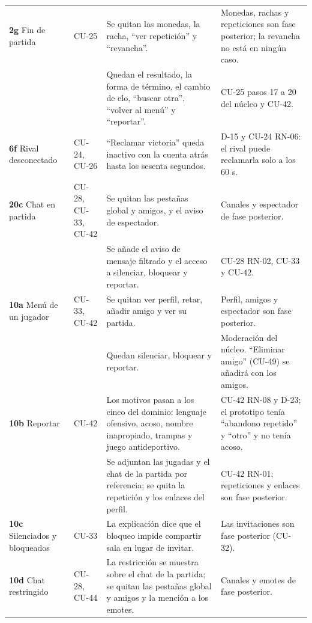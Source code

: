 \begin{center}
\begin{longtable}{|L{0.1\textwidth}|L{0.13\textwidth}|L{0.335\textwidth}|L{0.32\textwidth}|}
\textbf{2g} Fin de partida & \mbox{CU-25} & Se quitan las monedas, la racha, ``ver repetición'' y ``revancha''. & Monedas, rachas y repeticiones son fase posterior; la revancha no está en ningún caso. \\ 
 &  & Quedan el resultado, la forma de término, el cambio de elo, ``buscar otra'', ``volver al menú'' y ``reportar''. & \mbox{CU-25} pasos 17 a 20 del núcleo y \mbox{CU-42}. \\ \hline
\textbf{6f} Rival desconectado & \mbox{CU-24}, \mbox{CU-26} & ``Reclamar victoria'' queda inactivo con la cuenta atrás hasta los sesenta segundos. & \mbox{D-15} y \mbox{CU-24} \mbox{RN-06}: el rival puede reclamarla solo a los 60 s. \\ \hline
\textbf{20c} Chat en partida & \mbox{CU-28}, \mbox{CU-33}, \mbox{CU-42} & Se quitan las pestañas global y amigos, y el aviso de espectador. & Canales y espectador de fase posterior. \\ 
 &  & Se añade el aviso de mensaje filtrado y el acceso a silenciar, bloquear y reportar. & \mbox{CU-28} \mbox{RN-02}, \mbox{CU-33} y \mbox{CU-42}. \\ \hline
\textbf{10a} Menú de un jugador & \mbox{CU-33}, \mbox{CU-42} & Se quitan ver perfil, retar, añadir amigo y ver su partida. & Perfil, amigos y espectador son fase posterior. \\ 
 &  & Quedan silenciar, bloquear y reportar. & Moderación del núcleo. ``Eliminar amigo'' (\mbox{CU-49}) se añadirá con los amigos. \\ \hline
\textbf{10b} Reportar & \mbox{CU-42} & Los motivos pasan a los cinco del dominio: lenguaje ofensivo, acoso, nombre inapropiado, trampas y juego antideportivo. & \mbox{CU-42} \mbox{RN-08} y \mbox{D-23}; el prototipo tenía ``abandono repetido'' y ``otro'' y no tenía acoso. \\ 
 &  & Se adjuntan las jugadas y el chat de la partida por referencia; se quita la repetición y los enlaces del perfil. & \mbox{CU-42} \mbox{RN-01}; repeticiones y enlaces son fase posterior. \\ \hline
\textbf{10c} Silenciados y bloqueados & \mbox{CU-33} & La explicación dice que el bloqueo impide compartir sala en lugar de invitar. & Las invitaciones son fase posterior (\mbox{CU-32}). \\ \hline
\textbf{10d} Chat restringido & \mbox{CU-28}, \mbox{CU-44} & La restricción se muestra sobre el chat de la partida; se quitan las pestañas global y amigos y la mención a los emotes. & Canales y emotes de fase posterior. \\ \hline

\end{longtable}
\end{center}
